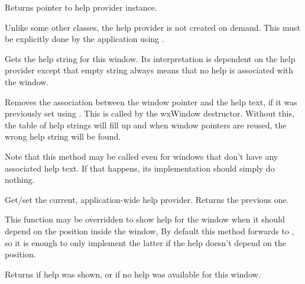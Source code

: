 Returns pointer to help provider instance.

Unlike some other classes, the help provider is not created on demand.
This must be explicitly done by the application using
.


\label{wxhelpprovidergethelp}


Gets the help string for this window. Its interpretation is dependent on the help provider
except that empty string always means that no help is associated with
the window.


\label{wxhelpproviderremovehelp}


Removes the association between the window pointer and the help text, if it
was previously set using . This is
called by the wxWindow destructor. Without this, the table of help strings will
fill up and when window pointers are reused, the wrong help string will be
found.

Note that this method may be called even for windows that don't have any
associated help text. If that happens, its implementation should simply do
nothing.


\label{wxhelpproviderset}


Get/set the current, application-wide help provider. Returns
the previous one.


\label{wxhelpprovidershowhelpatpoint}


This function may be overridden to show help for the window when it should
depend on the position inside the window, By default this method forwards to 
, so it is enough to only implement
the latter if the help doesn't depend on the position.

Returns \true if help was shown, or \false if no help was available for this
window.



